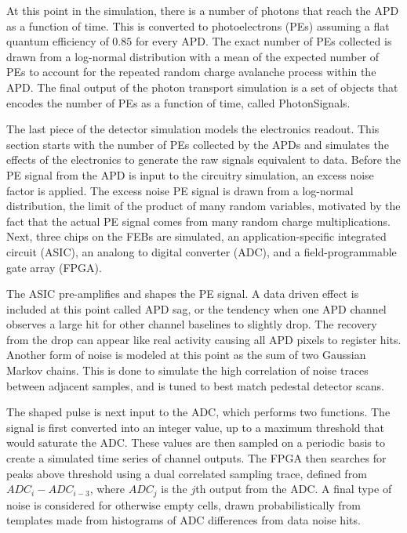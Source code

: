 At this point in the simulation, there is a number of photons that reach the APD as a function of time. This is converted to photoelectrons (PEs) assuming a flat quantum efficiency of $0.85$ for every APD. The exact number of PEs collected is drawn from a log-normal distribution with a mean of the expected number of PEs to account for the repeated random charge avalanche process within the APD. The final output of the photon transport simulation is a set of objects that encodes the number of PEs as a function of time, called PhotonSignals.


The last piece of the detector simulation models the electronics readout. This section starts with the number of PEs collected by the APDs and simulates the effects of the electronics to generate the raw signals equivalent to data. Before the PE signal from the APD is input to the circuitry simulation, an excess noise factor is applied. The excess noise PE signal is drawn from a log-normal distribution, the limit of the product of many random variables, motivated by the fact that the actual PE signal comes from many random charge multiplications. Next, three chips on the FEBs are simulated, an application-specific integrated circuit (ASIC), an analong to digital converter (ADC), and a field-programmable gate array (FPGA).

The ASIC pre-amplifies and shapes the PE signal. A data driven effect is included at this point called APD sag, or the tendency when one APD channel observes a large hit for other channel baselines to slightly drop. The recovery from the drop can appear like real activity causing all APD pixels to register hits. Another form of noise is modeled at this point as the sum of two Gaussian Markov chains. This is done to simulate the high correlation of noise traces between adjacent samples, and is tuned to best match pedestal detector scans.

The shaped pulse is next input to the ADC, which performs two functions. The signal is first converted into an integer value, up to a maximum threshold that would saturate the ADC. These values are then sampled on a periodic basis to create a simulated time series of channel outputs. The FPGA then searches for peaks above threshold using a dual correlated sampling trace, defined from $ADC_i - ADC_{i - 3}$, where $ADC_j$ is the $j$th output from the ADC. A final type of noise is considered for otherwise empty cells, drawn probabilistically from templates made from histograms of ADC differences from data noise hits.

